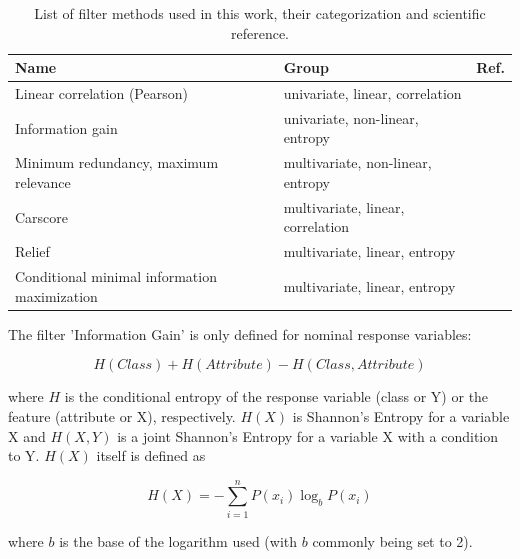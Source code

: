 \documentclass[final]{IEEEtran}
\begin{document}
\begin{table}[b!]
	\centering
	\caption{List of filter methods used in this work, their categorization and scientific reference.}
	\label{tab:filter-methods}
	\begingroup\footnotesize
	\begin{adjustbox}{width={0.48\textwidth},totalheight={\textheight},keepaspectratio}
		\begin{tabular}{lll}
			\\
			Name                                         & Group                             & Ref.               \\
			\toprule
			Linear correlation (Pearson)                 & univariate, linear, correlation   & \cite{pearson1901} \\
			Information gain                             & univariate, non-linear, entropy   & \cite{quinlan1986} \\
			Minimum redundancy, maximum relevance        & multivariate, non-linear, entropy & \cite{zhao2013}    \\
			Carscore                                     & multivariate, linear, correlation & \cite{zuber2011}   \\
			Relief                                       & multivariate, linear, entropy     & \cite{kira1992}    \\
			Conditional minimal information maximization & multivariate, linear, entropy     & \cite{fleuret2004}
		\end{tabular}
	\end{adjustbox}
	\endgroup
\end{table}

The filter 'Information Gain' is only defined for nominal response variables:

\begin{equation}
	H(Class) + H(Attribute) - H(Class, Attribute)
\end{equation}

where \(H\) is the conditional entropy of the response variable (class or Y) or the feature (attribute or X), respectively.
$H(X)$ is Shannon's Entropy \cite{shannon1948} for a variable X and $H(X, Y)$ is a joint Shannon's Entropy for a variable X with a condition to Y.
$H(X)$ itself is defined as

\begin{equation}
	H(X) = - \sum_{i=1}^{n} P(x_i)\log_bP(x_i)
\end{equation}

where $b$ is the base of the logarithm used (with $b$ commonly being set to 2).
\end{document}
